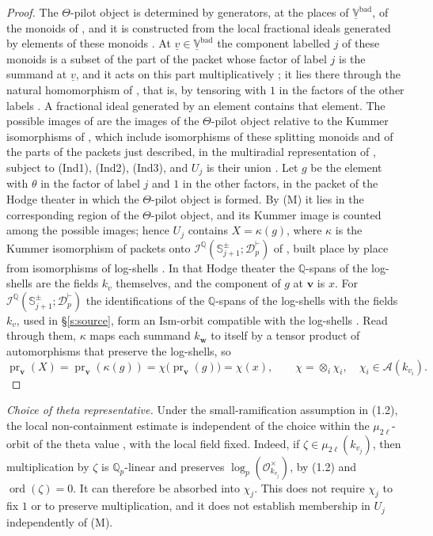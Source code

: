 \documentclass[11pt]{amsart}
\theoremstyle{remark}
\newcommand{\Q}{\mathbb Q}
\newcommand{\Qp}{\mathbb Q_p}
\newcommand{\cO}{\mathcal O}
\newcommand{\cA}{\mathcal A}
\newcommand{\cI}{\mathcal I}
\newcommand{\Vbad}{\underline{\mathbb V}^{\mathrm{bad}}}
\newcommand{\pr}{\operatorname{pr}}
\newcommand{\Sj}{\mathbb S^{\pm}_{j+1}}
\newcommand{\Dp}{\mathcal D^{\vdash}_{p}}
\newcommand{\bv}{\mathbf v}
\newcommand{\bw}{\mathbf w}
\begin{document}
\begin{proof}
The $\Theta$-pilot object is determined by generators, at the places of $\Vbad$, of the monoids of
\cite[Def.~3.8(i), p.~112]{IUT3}, and it is constructed from the local fractional ideals generated by elements of
these monoids \cite[Prop.~3.7(v), p.~112]{IUT3}. At $\underline v\in\Vbad$ the component labelled $j$ of these
monoids is a subset of the part of the packet whose factor of label $j$ is the summand at $\underline v$, and it acts
on this part multiplicatively \cite[Prop.~3.4(ii), pp.~102--103]{IUT3}; it lies there through the natural
homomorphism of \cite[Prop.~3.4(i)]{IUT3}, that is, by tensoring with $1$ in the factors of the other labels
\cite[Prop.~3.1(ii), p.~93]{IUT3}. A fractional ideal generated by an element contains that element. The possible
images of \cite[Cor.~3.12]{IUT3} are the images of the $\Theta$-pilot object relative to the Kummer isomorphisms of
\cite[Thm.~3.11(ii), p.~155]{IUT3}, which include isomorphisms of these splitting monoids and of the parts of the
packets just described, in the multiradial representation of \cite[Thm.~3.11(i)]{IUT3}, subject to (Ind1), (Ind2),
(Ind3), and $U_j$ is their union \cite[pp.~173--174]{IUT3}. Let $g$ be the element with $\theta$ in the factor of
label $j$ and $1$ in the other factors, in the packet of the Hodge theater in which the $\Theta$-pilot object is
formed. By \textup{(M)} it lies in the corresponding region of the $\Theta$-pilot object, and its Kummer image is counted among the possible images; hence $U_j$ contains
$X=\kappa(g)$, where $\kappa$ is the Kummer isomorphism of packets onto $\cI^{\Q}(\Sj;\Dp)$ of
\cite[Thm.~3.11(ii)(a)]{IUT3}, built place by place from isomorphisms of log-shells \cite[Prop.~3.2]{IUT3}. In that
Hodge theater the $\Q$-spans of the log-shells are the fields $k_v$ themselves, and the component of $g$ at $\bv$ is
$x$. For $\cI^{\Q}(\Sj;\Dp)$ the identifications of the $\Q$-spans of the log-shells with the fields $k_v$, used in
\S\ref{s:source}, form an $\mathrm{Ism}$-orbit compatible with the log-shells \cite[Prop.~1.2(vi), p.~32]{IUT3}. Read
through them, $\kappa$ maps each summand $k_{\bw}$ to itself by a tensor product of automorphisms that preserve the
log-shells, so
\[
\pr_{\bv}(X)=\pr_{\bv}(\kappa(g))=\chi\bigl(\pr_{\bv}(g)\bigr)=\chi(x),\qquad\chi=\otimes_i\chi_i,\quad
\chi_i\in\cA(k_{v_i}).
\]
\end{proof}

\smallskip
\noindent\emph{Choice of theta representative.}
Under the small-ramification assumption in (1.2), the local non-containment estimate is
independent of the choice within the $\mu_{2\ell}$-orbit of the theta value
\cite[Rem.~3.11.4(i), p.~171]{IUT3}, with the local field fixed.
Indeed, if $\zeta\in\mu_{2\ell}(k_{v_j})$, then multiplication by $\zeta$ is
$\Qp$-linear and preserves $\log_p(\cO_{k_{v_j}}^\times)$, by (1.2) and
$\operatorname{ord}(\zeta)=0$. It can therefore be absorbed into $\chi_j$.
This does not require $\chi_j$ to fix $1$ or to preserve multiplication, and it does
not establish membership in $U_j$ independently of \textup{(M)}.
\end{document}
